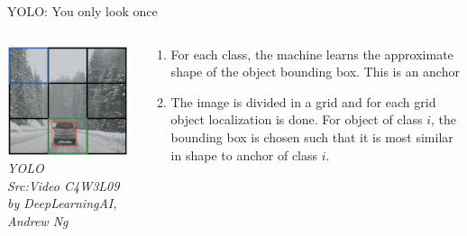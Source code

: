 \begin{frame}{YOLO: You only look once}
	\begin{columns}[T]
        \begin{column}{0.4\textwidth}
        	\includegraphics[width=\textwidth]{images/YOLO.png}
			\tiny{\textit{YOLO\\Src:Video C4W3L09 by DeepLearningAI, Andrew Ng }}
        \end{column}
		\begin{column}{0.6\textwidth}
			\begin{enumerate}[$\bullet$]
				\item For each class, the machine learns the approximate shape of the object bounding box. This is an anchor\pause
				\item The image is divided in a grid and for each grid object localization is done. For object of class $i$, the bounding box is chosen such that it is most similar in shape to anchor of class $i$.
			\end{enumerate}
		\end{column} 
    \end{columns}
\end{frame}

